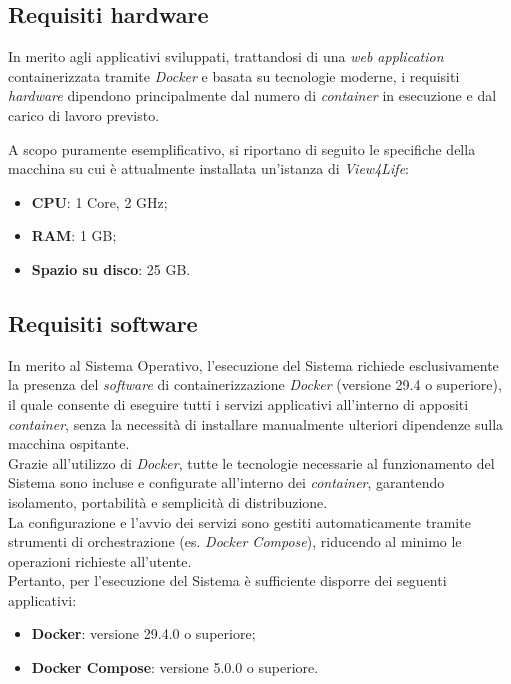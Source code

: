\documentclass[10pt, letterpaper]{article}
\begin{document}
\subsection{Requisiti hardware}
In merito agli applicativi sviluppati, trattandosi di una \textit{web application} containerizzata tramite \textit{Docker} 
e basata su tecnologie moderne, i requisiti \textit{hardware} 
dipendono principalmente dal numero di \textit{container} in esecuzione e dal carico di lavoro previsto.

A scopo puramente esemplificativo, si riportano di seguito le specifiche della macchina su cui è attualmente installata un'istanza di \textit{View4Life}: 

\begin{itemize}
    \item \textbf{CPU}: 1 Core, 2 GHz;
    \item \textbf{RAM}: 1 GB;
    \item \textbf{Spazio su disco}: 25 GB.
\end{itemize}

\subsection{Requisiti software}
In merito al Sistema Operativo, l'esecuzione del Sistema richiede esclusivamente la presenza del \textit{software} di containerizzazione \textit{Docker} (versione 29.4 o superiore), 
il quale consente di eseguire tutti i servizi applicativi all'interno di appositi \textit{container}, senza la necessità di installare manualmente ulteriori dipendenze sulla macchina ospitante.
\\Grazie all'utilizzo di \textit{Docker}, tutte le tecnologie necessarie al funzionamento del Sistema 
sono incluse e configurate all'interno dei \textit{container}, garantendo isolamento, portabilità e semplicità di distribuzione.
\\La configurazione e l'avvio dei servizi sono gestiti automaticamente tramite strumenti di orchestrazione (es. \textit{Docker Compose}), 
riducendo al minimo le operazioni richieste all'utente.
\\Pertanto, per l'esecuzione del Sistema è sufficiente disporre dei seguenti applicativi:
\begin{itemize}
    \item \textbf{Docker}: versione 29.4.0 o superiore;
    \item \textbf{Docker Compose}: versione 5.0.0 o superiore.
\end{itemize}
\end{document}

